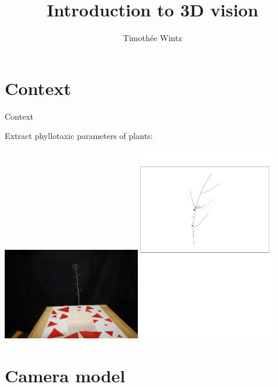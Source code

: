 \documentclass[aspectratio=169]{beamer}
\title{Introduction to 3D vision}
\author{Timothée Wintz}\institute{Sony CSL Paris}
\begin{document}
\begin{frame}
\titlepage
\end{frame}

\section{Context}
\begin{frame}
    \tableofcontents[sectionstyle=show/shaded]
\end{frame}
\begin{frame}{Context}

    \centering
    Extract phyllotaxic parameters of plants:

    \includegraphics[width=0.45\textwidth]{images/rgb_b.jpg}
    \includegraphics[width=0.45\textwidth]{images/angle-inter.pdf}
\end{frame}


\section{Camera model}

\begin{frame}
    \tableofcontents
\end{frame}

\begin{frame}
    \tableofcontents[sectionstyle=show/shaded]
\end{frame}
\end{document}
